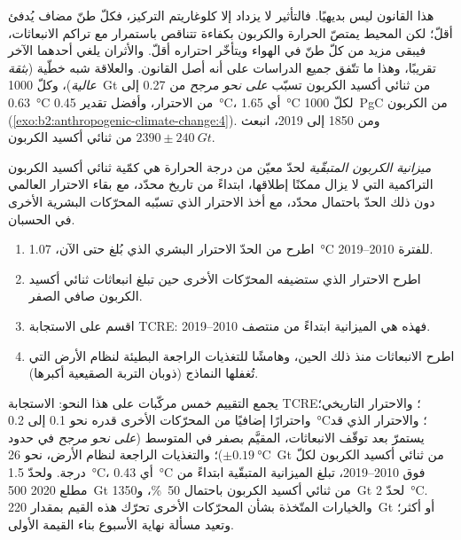 هذا القانون ليس بديهيًا. فالتأثير لا يزداد إلا كلوغاريتم التركيز، فكلّ
طنّ مضاف يُدفئ أقلّ؛ لكن المحيط يمتصّ الحرارة والكربون بكفاءة تتناقص باستمرار مع
تراكم الانبعاثات، فيبقى مزيد من كلّ طنّ في الهواء ويتأخّر احتراره أقلّ.
والأثران يلغي أحدهما الآخر تقريبًا، وهذا ما تتّفق جميع الدراسات على أنه أصل القانون. والعلاقة
شبه خطّية (\emph{بثقة عالية})، وكلّ \qty{1000}{Gt} من ثنائي أكسيد الكربون تسبّب \emph{على نحو مرجح}
من 0.27 إلى \qty{0.63}{\celsius} من الاحترار، وأفضل تقدير \qty{0.45}{\celsius}، أي \qty{1.65}{\celsius}
لكلّ \qty{1000}{PgC} من الكربون (\cref{exo:b2:anthropogenic-climate-change:4}). ومن 1850 إلى 2019،
انبعث $\num{2390} \pm \qty{240}{Gt}$ من ثنائي أكسيد الكربون.

\begin{definition}\label{def:b2:anthropogenic-climate-change:budget}
\emph{ميزانية الكربون المتبقّية} لحدّ معيّن من درجة الحرارة هي
كمّية ثنائي أكسيد الكربون التراكمية التي لا يزال ممكنًا إطلاقها، ابتداءً من تاريخ محدّد، مع بقاء الاحترار العالمي
دون ذلك الحدّ باحتمال محدّد، مع أخذ الاحترار الذي تسبّبه المحرّكات البشرية الأخرى
في الحسبان.
\end{definition}

\begin{method}\label{met:b2:anthropogenic-climate-change:budget}
\begin{enumerate}
  \item اطرح من الحدّ الاحترار البشري الذي بُلغ حتى الآن، \qty{1.07}{\celsius}
        للفترة 2010--2019.
  \item اطرح الاحترار الذي ستضيفه المحرّكات الأخرى حين تبلغ انبعاثات ثنائي أكسيد الكربون
        صافي الصفر.
  \item اقسم على الاستجابة TCRE: فهذه هي الميزانية ابتداءً من منتصف 2010--2019.
  \item اطرح الانبعاثات منذ ذلك الحين، وهامشًا للتغذيات الراجعة البطيئة لنظام الأرض التي
        تُغفلها النماذج (ذوبان التربة الصقيعية أكبرها).
\end{enumerate}
\end{method}

يجمع التقييم خمس مركّبات على هذا النحو: الاستجابة TCRE؛ والاحترار التاريخي؛
واحترارًا إضافيًا من المحرّكات الأخرى قدره نحو 0.1 إلى \qty{0.2}{\celsius}؛ والاحترار الذي قد
يستمرّ بعد توقّف الانبعاثات، المقيَّم بصفر في المتوسط (\emph{على نحو مرجح} في حدود $\pm
\qty{0.19}{\celsius}$)؛ والتغذيات الراجعة لنظام الأرض، نحو \qty{26}{Gt} من ثنائي أكسيد الكربون لكلّ
درجة. ولحدّ \qty{1.5}{\celsius}، أي \qty{0.43}{\celsius} فوق 2010--2019، تبلغ الميزانية المتبقّية ابتداءً من
مطلع 2020 \qty{500}{Gt} من ثنائي أكسيد الكربون باحتمال \qty{50}{\percent}،
و\qty{1350}{Gt} لحدّ \qty{2}{\celsius}. والخيارات المتّخذة بشأن المحرّكات الأخرى تحرّك هذه القيم بمقدار
\qty{220}{Gt} أو أكثر؛ وتعيد مسألة نهاية الأسبوع بناء القيمة الأولى.

